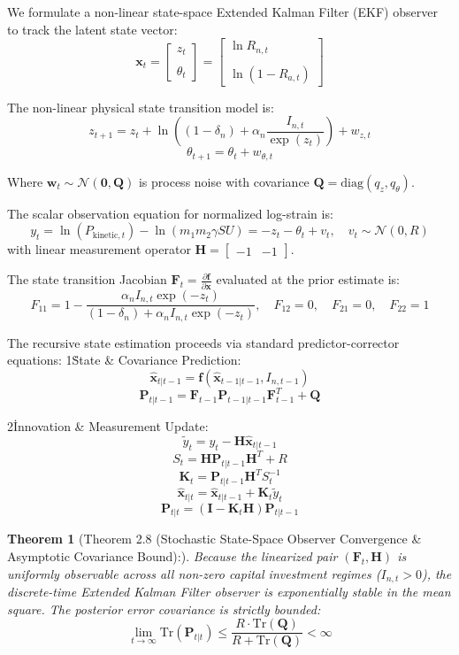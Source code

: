 \documentclass[preprint,12pt,authoryear]{elsarticle}
\newtheorem{theorem}{Theorem}
\theoremstyle{definition}
\begin{document}
We formulate a non-linear state-space Extended Kalman Filter (EKF) observer to track the latent state vector:  
$$\mathbf{x}_t = \begin{bmatrix} z_t \\\\ \theta_t \end{bmatrix} = \begin{bmatrix} \ln R_{n,t} \\\\ \ln(1 - R_{a,t}) \end{bmatrix}$$

The non-linear physical state transition model is:  
$$z_{t+1} = z_t + \ln\left( (1 - \delta_n) + \alpha_n \frac{I_{n,t}}{\exp(z_t)} \right) + w_{z,t}$$  
$$\theta_{t+1} = \theta_t + w_{\theta,t}$$

Where $\mathbf{w}_t \sim \mathcal{N}(\mathbf{0}, \mathbf{Q})$ is process noise with covariance $\mathbf{Q} = \text{diag}(q_z, q_\theta)$.

The scalar observation equation for normalized log-strain is:  
$$y_t = \ln(P_{\text{kinetic},t}) - \ln(m_1 m_2 \gamma S U) = -z_t - \theta_t + v_t, \quad v_t \sim \mathcal{N}(0, R)$$  
with linear measurement operator $\mathbf{H} = \begin{bmatrix} -1 & -1 \end{bmatrix}$.

The state transition Jacobian $\mathbf{F}_t = \frac{\partial \mathbf{f}}{\partial \mathbf{x}}$ evaluated at the prior estimate is:  
$$F_{11} = 1 - \frac{\alpha_n I_{n,t} \exp(-z_t)}{(1 - \delta_n) + \alpha_n I_{n,t} \exp(-z_t)}, \quad F_{12} = 0, \quad F_{21} = 0, \quad F_{22} = 1$$

The recursive state estimation proceeds via standard predictor-corrector equations:  
1\. State \& Covariance Prediction:  
$$\hat{\mathbf{x}}_{t|t-1} = \mathbf{f}(\hat{\mathbf{x}}_{t-1|t-1}, I_{n,t-1})$$  
$$\mathbf{P}_{t|t-1} = \mathbf{F}_{t-1} \mathbf{P}_{t-1|t-1} \mathbf{F}_{t-1}^T + \mathbf{Q}$$

2\. Innovation \& Measurement Update:  
$$\tilde{y}_t = y_t - \mathbf{H} \hat{\mathbf{x}}_{t|t-1}$$  
$$S_t = \mathbf{H} \mathbf{P}_{t|t-1} \mathbf{H}^T + R$$  
$$\mathbf{K}_t = \mathbf{P}_{t|t-1} \mathbf{H}^T S_t^{-1}$$  
$$\hat{\mathbf{x}}_{t|t} = \hat{\mathbf{x}}_{t|t-1} + \mathbf{K}_t \tilde{y}_t$$  
$$\mathbf{P}_{t|t} = (\mathbf{I} - \mathbf{K}_t \mathbf{H}) \mathbf{P}_{t|t-1}$$

\begin{theorem}[Theorem 2.8 (Stochastic State-Space Observer Convergence \& Asymptotic Covariance Bound):] Because the linearized pair $(\mathbf{F}_t, \mathbf{H})$ is uniformly observable across all non-zero capital investment regimes ($I_{n,t} > 0$), the discrete-time Extended Kalman Filter observer is exponentially stable in the mean square. The posterior error covariance is strictly bounded:  
$$\lim_{t \to \infty} \text{Tr}(\mathbf{P}_{t|t}) \le \frac{R \cdot \text{Tr}(\mathbf{Q})}{R + \text{Tr}(\mathbf{Q})} < \infty$$
\end{theorem}
\end{document}
